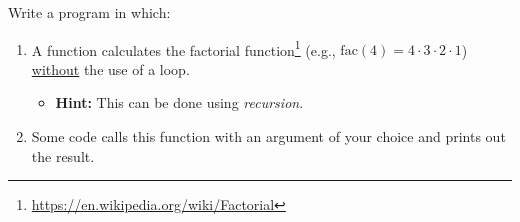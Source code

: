Write a program in which:
\begin{enumerate}
  \item A function calculates the factorial function\footnote{\url{https://en.wikipedia.org/wiki/Factorial}} (e.g., $\mathrm{fac}(4) = 4 \cdot 3 \cdot 2 \cdot 1$) \underline{without} the use of a loop.
    \begin{itemize}
      \item \textbf{Hint:} This can be done using \textsl{recursion}.
    \end{itemize}
  \item Some code calls this function with an argument of your choice and prints out the result.
\end{enumerate}
